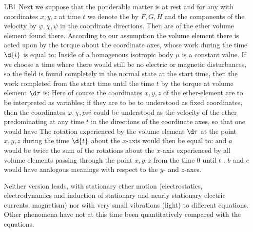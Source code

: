 \begin{paper}{LB1}
Next we suppose that the ponderable matter is at rest and for any  with coordinates $x,y,z$ at time $t$ we denote the  by $F, G, H$ and the components of the velocity by $\varphi, \chi, \psi$ in the coordinate directions. Then
are  of the ether volume element found there. According to our assumption the volume element there is acted upon by the torque
about the coordinate axes, whose work during the time $\d{t}$ is equal to:
Inside of a homogenous isotropic body $\mu$ is a constant value. If we choose a time where there would still be no electric or magnetic disturbances, so the field is found completely in the normal state at the start time, then the work completed from the start time until the time $t$ by the torque at volume element $\d\tau$ is:
Here of course the coordinates $x,y,z$ of the ether-element are to be interpreted as variables; if they are to be to understood as fixed coordinates, then the coordinates $\varphi, \chi, 
psi$ could be understood as the velocity of the ether predominating at any time $t$ in the directions of the coordinate axes, so that one would have
The rotation experienced by the volume element $\d\tau$ at the point $x,y,z$ during the time $\d{t}$ about the $x$-axis would then be equal to:
and $a$ would be twice the sum of the rotations about the $x$-axis experienced by all volume elements passing through the point $x,y,z$ from the time 0 until $t$ . $b$ and $c$ would have analogous meanings with respect to the $y$- and $z$-axes.

Neither version leads, with stationary ether motion (electrostatics, electrodynamics and induction of stationary and nearly stationary electric currents, magnetism) nor with very small vibrations (light) to different equations. Other phenomena have not at this time been quantitatively compared with the equations.


\end{paper}
